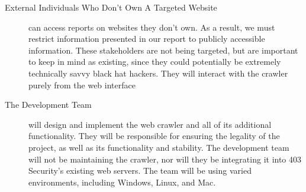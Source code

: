 \begin{description}
\item[External Individuals Who Don’t Own A Targeted Website] can access reports on websites they don’t own. As a result, we must restrict information presented in our report to publicly accessible information. These stakeholders are not being targeted, but are important to keep in mind as existing, since they could potentially be extremely technically savvy black hat hackers.  They will interact with the crawler purely from the web interface

\item[The Development Team] will design and implement the web crawler and all of its additional functionality.  They will be responsible for ensuring the legality of the project, as well as its functionality and stability.  The development team will not be maintaining the crawler, nor will they be integrating it into 403 Security’s existing web servers.  The team will be using varied environments, including Windows, Linux, and Mac.
\end{description}
